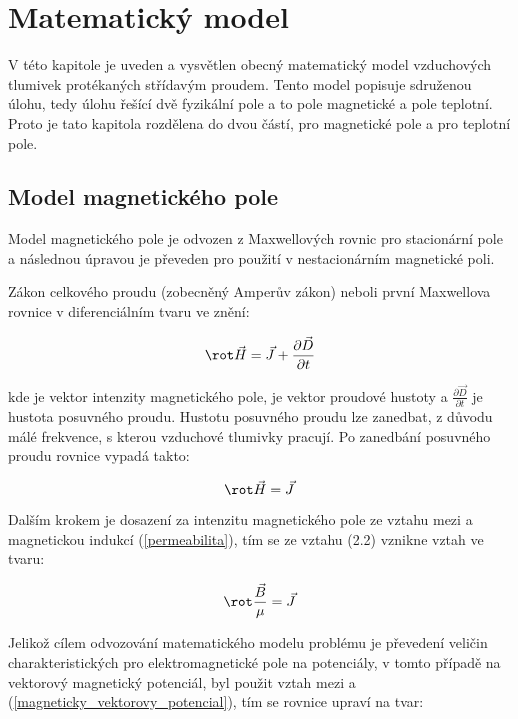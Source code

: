 \chapter{Matematický model} 
\label{matematicky_model}
V této kapitole je uveden a vysvětlen obecný matematický model vzduchových tlumivek protékaných střídavým proudem. Tento model popisuje sdruženou úlohu, tedy úlohu řešící dvě fyzikální pole a to pole magnetické a pole teplotní. Proto je tato kapitola rozdělena do dvou částí, pro magnetické pole a pro teplotní pole.

\section{Model magnetického pole}
Model magnetického pole je odvozen z Maxwellových rovnic pro stacionární pole a následnou úpravou je převeden pro použití v nestacionárním magnetické poli.

	Zákon celkového proudu (zobecněný Amperův zákon) neboli první Maxwellova rovnice v diferenciálním tvaru ve znění:
	
\begin{equation}
	\rot \vec{H} = \vec{J} + \frac{\partial \vec{D}}{\partial t}
\end{equation}

kde  je vektor intenzity magnetického pole,  je vektor proudové hustoty a $\frac{\partial \vec{D}}{\partial t}$ je hustota posuvného proudu. Hustotu posuvného proudu lze zanedbat, z důvodu málé frekvence, s kterou vzduchové tlumivky pracují.
Po zanedbání posuvného proudu rovnice vypadá takto:

\begin{equation}
	\rot \vec{H} = \vec{J}
\end{equation}

Dalším krokem je dosazení za intenzitu magnetického pole  ze vztahu mezi  a magnetickou indukcí  (\ref{permeabilita}), tím se ze vztahu (2.2) vznikne vztah ve tvaru:

\begin{equation}
	\rot \frac{\vec{B}}{\mu} = \vec{J}
\end{equation}

Jelikož cílem odvozování matematického modelu problému je převedení veličin charakteristických pro elektromagnetické pole na potenciály, v tomto případě na vektorový magnetický potenciál, byl použit vztah mezi  a (\ref{magneticky_vektorovy_potencial}), tím se rovnice upraví na tvar:

